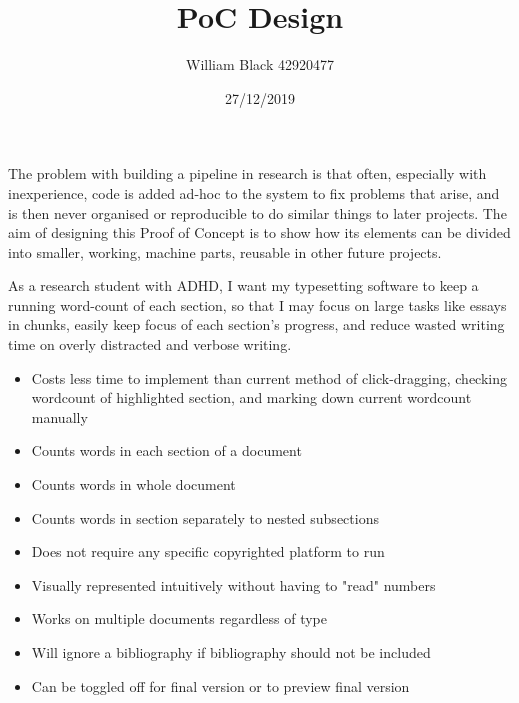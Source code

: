 \documentclass[10pt]{article}
\title{PoC Design}
\author{William Black 42920477}
\date{27/12/2019}
\begin{document}
\maketitle


The problem with building a pipeline in research is that often, especially with inexperience, code is added ad-hoc to the system to fix problems that arise, and is then never organised or reproducible to do similar things to later projects. The aim of designing this Proof of Concept is to show how its elements can be divided into smaller, working, machine parts, reusable in other future projects.


As a research student with ADHD, I want my typesetting software to keep a running word-count of each section, so that I may focus on large tasks like essays in chunks, easily keep focus of each section's progress, and reduce wasted writing time on overly distracted and verbose writing.


\begin{itemize}
    \item Costs less time to implement than current method of click-dragging, checking wordcount of highlighted section, and marking down current wordcount manually
    \item Counts words in each section of a document
    \item Counts words in whole document
    \item Counts words in section separately to nested subsections
    \item Does not require any specific copyrighted platform to run
    \item Visually represented intuitively without having to "read" numbers
    \item Works on multiple documents regardless of type
    \item Will ignore a bibliography if bibliography should not be included
    \item Can be toggled off for final version or to preview final version
\end{itemize}

\end{document}
